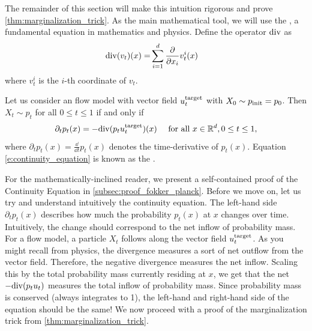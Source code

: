 The remainder of this section will make this intuition rigorous and prove \cref{thm:marginalization_trick}. As the main mathematical tool, we will use the , a fundamental equation in mathematics and physics. Define the  operator $\mathrm{div}$ as
\begin{align}
\label{eq:divergence_laplacian_definition}
    \mathrm{div}(v_t)(x)=&\sum\limits_{i=1}^{d}\frac{\partial}{\partial x_i}v_t^i(x)
\end{align}
where $v_t^i$ is the $i$-th coordinate of $v_t$.
\begin{theorem}
\label{thm:continuity_equation}
Let us consider an flow model with vector field $u^{\text{target}}_t$ with $X_0\sim p_{\rm{init}}=p_0$. Then $X_t\sim p_t$ for all $0\leq t\leq 1$ if and only if
\begin{align}
\label{e:continuity_equation}
\partial_t p_t(x)=-\mathrm{div} (p_tu^{\text{target}}_t)(x)\quad \text{ for all }x\in\mathbb{R}^d, 0\leq t\leq 1,
\end{align}
where $\partial_tp_t(x)= \frac{\dd}{\dd t}p_t(x)$ denotes the time-derivative of $p_t(x)$. Equation \ref{e:continuity_equation} is known as the .
\end{theorem}
For the mathematically-inclined reader, we present a self-contained proof of the Continuity Equation in \cref{subsec:proof_fokker_planck}. Before we move on, let us try and understand intuitively the continuity equation. The left-hand side $\partial_tp_t(x)$ describes how much the probability $p_t(x)$ at $x$ changes over time. Intuitively, the change should correspond to the net inflow of probability mass. For a flow model, a particle $X_t$ follows along the vector field $u^{\text{target}}_t$. As you might recall from physics, the divergence measures a sort of net outflow from the vector field. Therefore, the negative divergence measures the net inflow. Scaling this by the total probability mass currently residing at $x$, we get that the net $-\mathrm{div} (p_tu_t)$ measures the total inflow of probability mass. Since probability mass is conserved (always integrates to 1), the left-hand and right-hand side of the equation should be the same! We now proceed with a proof of the marginalization trick from \cref{thm:marginalization_trick}.
